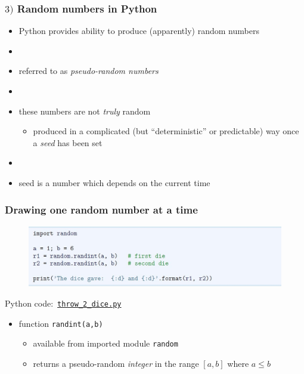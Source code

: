 \documentclass[14pt]{beamer}
\newcommand\red[1]{{\color{red} #1}}
\begin{document}

\begin{frame}[fragile]

\frametitle{$3)$ Random numbers in Python}

\begin{itemize}
	\item Python provides ability to produce (apparently) random numbers
	\item[]
	\item referred to as \red{\emph{pseudo-random numbers}}
	\item[]
	\item these numbers are not \emph{truly} random
	\begin{itemize}
		\item produced in a complicated (but ``deterministic'' or predictable) way once a \red{\emph{seed}} has been set
	\end{itemize}	
	\item[]
	\item seed is a number which depends on the current time
		
\end{itemize}

\end{frame}


\begin{frame}[fragile]

\frametitle{Drawing \textbf{one} random number at a time}

\begin{figure}[ht]
	\centering
	\includegraphics[width=\textwidth]{figures/LLp54}
\end{figure}

Python code:~\href{https://github.com/slgit/prog4comp_2/blob/master/py36-src/throw_2_dice.py}{\texttt{throw\_2\_dice.py}}

\begin{itemize}
	\item function \texttt{randint(a,b)}
	\begin{itemize}
		\item available from imported module \texttt{random} %
		\item returns a pseudo-random \emph{integer} in the range $[a,b]$ where $a \leq b$
	\end{itemize}
\end{itemize}

\end{frame}
\end{document}
